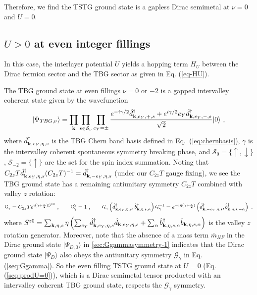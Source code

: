 \documentclass[prb,aps,nofootinbib,amssymb,twocolumn,superscriptaddress,10pt]{revtex4-2}
\begin{document}
\begin{widetext}
Therefore, we find the TSTG ground state is a gapless Dirac semimetal at $\nu=0$ and $U=0$.

\subsection{\texorpdfstring{$U>0$}{U>0} at even integer fillings}

In this case, the interlayer potential $U$ yields a hopping term $H_U$ between the Dirac fermion sector and the TBG sector as given in Eq. (\ref{eq-HU}). 

The TBG ground state at even fillings $\nu=0$ or $-2$ is a gapped intervalley coherent state given by the wavefunction \cite{BUL20,LIA20}
\begin{equation}
|\Psi_{TBG,\nu}\rangle=\prod_{\mathbf{k}} \prod_{s\in \mathcal{S}_\nu} \prod_{e_Y=\pm} \frac{e^{-i\gamma/2}\hat{d}^\dag_{\mathbf{k},e_{Y},+,s}+ e^{i\gamma/2} e_{Y}\hat{d}^\dag_{\mathbf{k},e_{Y},-,s}}{\sqrt{2}}|0\rangle\ ,
\end{equation}
where $\hat{d}^\dag_{\mathbf{k},e_{Y},\eta,s}$ is the TBG Chern band basis defined in Eq.~(\ref{eq:chernbasis}), $\gamma$ is the intervalley coherent spontaneous symmetry breaking phase, and $\mathcal{S}_0=\{\uparrow,\downarrow\}$, $\mathcal{S}_{-2}=\{\uparrow\}$ are the set for the spin index summation. Noting that $C_{2z}T\hat{d}^\dag_{\mathbf{k},e_{Y},\eta,s}(C_{2z}T)^{-1}=\hat{d}^\dag_{\mathbf{k},-e_{Y},\eta,s}$ (under our $C_{2z}T$ gauge fixing), we see the TBG ground state has a remaining antiunitary symmetry $C_{2z}T$ combined with valley $z$ rotation:
\begin{equation}\label{seq:Ggamma}
\mathcal{G}_\gamma=C_{2z}T e^{i(\gamma+\frac{\pi}{2})S^{z0}}\ , \qquad \mathcal{G}_\gamma^2=1\ ,\qquad \mathcal{G}_\gamma \left(\hat{d}^\dag_{\mathbf{k},e_{Y},\eta,s}, \hat{b}^\dag_{\mathbf{k},\eta,s,\alpha}\right)\mathcal{G}_\gamma^{-1}=e^{-i\eta(\gamma+\frac{\pi}{2})}\left(\hat{d}^\dag_{\mathbf{k},-e_{Y},\eta,s}, \hat{b}^\dag_{\mathbf{k},\eta,s,-\alpha}\right)\ .
\end{equation}
where $S^{z0}=\sum_{\mathbf{k},\eta,s}\eta \left(\sum_{e_Y}\hat{d}^\dag_{\mathbf{k},e_{Y},\eta,s}\hat{d}_{\mathbf{k},e_{Y},\eta,s}+\sum_{\alpha}\hat{b}^\dag_{\mathbf{k},\eta,s,\alpha}\hat{b}_{\mathbf{k},\eta,s,\alpha}\right)$ is the valley $z$ rotation generator. Moreover, note that the absence of a mass term $\overline{m}_{HF}$ in the Dirac ground state $|\Psi_{D,0}\rangle$ in \ref{sec:Ggammasymmetry-1} indicates that the Dirac ground state $|\Psi_D\rangle$ also obeys the antiunitary symmetry $\mathcal{G}_\gamma$ in Eq. (\ref{seq:Ggamma}). So the even filling TSTG ground state at $U=0$ (Eq. (\ref{seq:prodU=0})), which is a Dirac semimetal tensor producted with an intervalley coherent TBG ground state, respects the $\mathcal{G}_\gamma$ symmetry.


\end{widetext}
\end{document}
